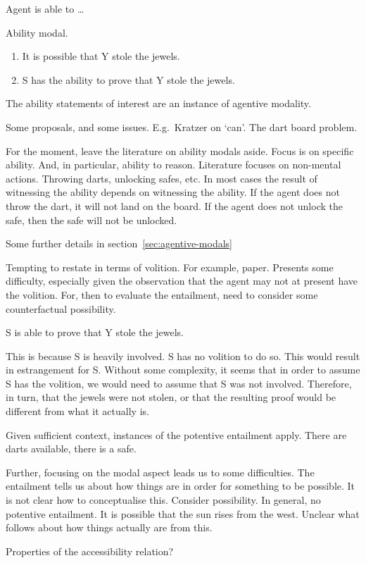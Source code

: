 \begin{note}
  Agent is able to \dots

  Ability modal.

  \begin{enumerate}
  \item It is possible that Y stole the jewels.
  \item S has the ability to prove that Y stole the jewels.
  \end{enumerate}

  The ability statements of interest are an instance of agentive modality.
  \cite{Mandelkern:2017aa}
  \cite{Maier:2013vk}
  \cite{Schwarz:2020aa}
  \cite{Willer:2021ur}
  \cite{Maier:2021te}

  Some proposals, and some issues.
  E.g.\ Kratzer on `can'.
  The dart board problem.

  For the moment, leave the literature on ability modals aside.
  Focus is on specific ability.
  And, in particular, ability to reason.
  Literature focuses on non-mental actions.
  Throwing darts, unlocking safes, etc.
  In most cases the result of witnessing the ability depends on witnessing the ability.
  If the agent does not throw the dart, it will not land on the board.
  If the agent does not unlock the safe, then the safe will not be unlocked.

  Some further details in section~\ref{sec:agentive-modals}
\end{note}

\begin{note}[No volition]
  Tempting to restate in terms of volition.
  For example, paper.
  Presents some difficulty, especially given the observation that the agent may not at present have the volition.
  For, then to evaluate the entailment, need to consider some counterfactual possibility.

  S is able to prove that Y stole the jewels.

  This is because S is heavily involved.
  S has no volition to do so.
  This would result in estrangement for S.
  Without some complexity, it seems that in order to assume S has the volition, we would need to assume that S was not involved.
  Therefore, in turn, that the jewels were not stolen, or that the resulting proof would be different from what it actually is.
\end{note}

\begin{note}
  Given sufficient context, instances of the potentive entailment apply.
  There are darts available, there is a safe.

  Further, focusing on the modal aspect leads us to some difficulties.
  The entailment tells us about how things are in order for something to be possible.
  It is not clear how to conceptualise this.
  Consider possibility.
  In general, no potentive entailment.
  It is possible that the sun rises from the west.
  Unclear what follows about how things actually are from this.

  Properties of the accessibility relation?
\end{note}

